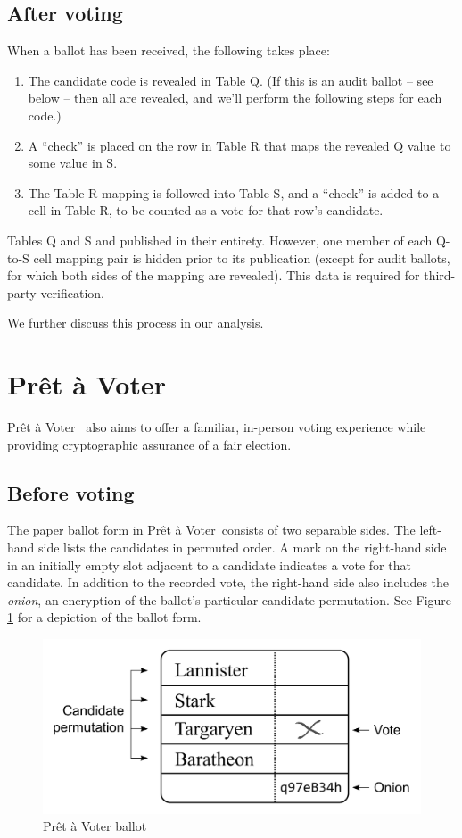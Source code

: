 \documentclass[10pt,twocolumn]{article}
\newcommand{\term}[1]{\textit{#1}}
\newcommand{\preta}{Pr\^{e}t \`{a}}
\newcommand{\pv}{\preta{} Voter}
\begin{document}
\subsection{After voting}

When a ballot has been received, the following takes place:
\begin{enumerate}
	\item
		The candidate code is revealed in Table Q. (If this is an audit ballot -- see below -- then all
		are revealed, and we'll perform the following steps for each code.)
	\item
		A ``check'' is placed on the row in Table R that maps the revealed Q value to some value in S.
	\item
		The Table R mapping is followed into Table S, and a ``check'' is added to a cell in Table R,
		to be counted as a vote for that row's candidate.
\end{enumerate}

Tables Q and S and published in their entirety. However, one member of each Q-to-S cell mapping pair
is hidden prior to its publication (except for audit ballots, for which both sides of the mapping
are revealed). This data is required for third-party verification.

We further discuss this process in our analysis.

\section{\pv{}}

\pv\ \cite{preta} also aims to offer a familiar, in-person voting experience while providing cryptographic assurance of
a fair election.

\subsection{Before voting}

The paper ballot form in \pv\ consists of two separable sides.
The left-hand side lists the candidates in permuted order.
A mark on the right-hand side in an initially empty slot adjacent to a candidate indicates a vote for that candidate.
In addition to the recorded vote, the right-hand side also includes the \term{onion}, an encryption of the ballot's particular candidate permutation.
See Figure \ref{fig:preta} for a depiction of the ballot form.

\begin{figure}
	\center
	\includegraphics[width=\columnwidth]{images/include/preta.pdf}
	\caption{\pv{} ballot}
	\label{fig:preta}
\end{figure}
\end{document}
